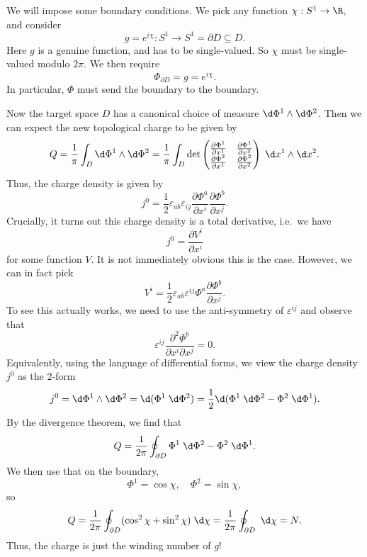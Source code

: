 \documentclass[a4paper]{article}
\begin{document}
We will impose some boundary conditions. We pick any function $\chi: S^1 \to \R$, and consider
\[
  g = e^{i\chi}: S^1 \to S^1 = \partial D \subseteq D.
\]
Here $g$ is a genuine function, and has to be single-valued. So $\chi$ must be single-valued modulo $2\pi$. We then require
\[
  \Phi_{\partial D} = g = e^{i \chi}.
\]
In particular, $\Phi$ must send the boundary to the boundary.

Now the target space $D$ has a canonical choice of measure $\d \Phi^1 \wedge \d \Phi^2$. Then we can expect the new topological charge to be given by
\[
  Q = \frac{1}{\pi} \int_D \d \Phi^1 \wedge \d \Phi^2 = \frac{1}{\pi} \int_D \det
  \begin{pmatrix}
    \frac{\partial \Phi^1}{\partial x^1} & \frac{\partial \Phi^1}{\partial x^2}\\
    \frac{\partial \Phi^2}{\partial x^1} & \frac{\partial \Phi^2}{\partial x^2}
  \end{pmatrix}\;\d x^1 \wedge \d x^2.
\]
Thus, the charge density is given by
\[
  j^0 = \frac{1}{2} \varepsilon_{ab} \varepsilon_{ij} \frac{\partial \Phi^a}{\partial x^i} \frac{\partial \Phi^b}{\partial x^j}.
\]
Crucially, it turns out this charge density is a total derivative, i.e.\ we have
\[
  j^0 = \frac{\partial V^i}{\partial x^i}
\]
for some function $V$. It is not immediately obvious this is the case. However, we can in fact pick
\[
  V^i = \frac{1}{2} \varepsilon_{ab}\varepsilon^{ij} \Phi^a \frac{\partial \Phi^b}{\partial x^j}.
\]
To see this actually works, we need to use the anti-symmetry of $\varepsilon^{ij}$ and observe that
\[
  \varepsilon^{ij} \frac{\partial^2 \Phi^b}{\partial x^i \partial x^j} = 0.
\]
Equivalently, using the language of differential forms, we view the charge density $j^0$ as the $2$-form
\[
  j^0 = \d \Phi^1 \wedge \d \Phi^2 = \d (\Phi^1\;\d \Phi^2) = \frac{1}{2} \d (\Phi^1 \;\d \Phi^2 - \Phi^2 \;\d \Phi^1).
\]
By the divergence theorem, we find that
\[
  Q = \frac{1}{2\pi}\oint_{\partial D} \Phi^1 \;\d \Phi^2 - \Phi^2 \;\d \Phi^1.
\]
We then use that on the boundary,
\[
  \Phi^1 = \cos \chi,\quad \Phi^2 = \sin \chi,
\]
so
\[
  Q = \frac{1}{2\pi} \oint_{\partial D} (\cos^2 \chi + \sin^2 \chi) \;\d \chi = \frac{1}{2\pi} \oint_{\partial D} \;\d \chi = N.
\]
Thus, the charge is just the winding number of $g$!
\end{document}
